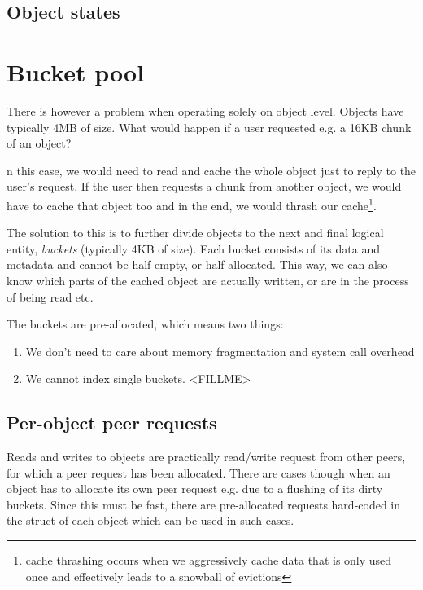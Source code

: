 
\subsection{Object states}


\section{Bucket pool}

There is however a problem when operating solely on object level. Objects have 
typically 4MB of size. What would happen if a user requested e.g. a 16KB chunk 
of an object?

n this case, we would need to read and cache the whole object just to reply to 
the user's request. If the user then requests a chunk from another object, we 
would have to cache that object too and in the end, we would thrash our 
cache\footnote{cache thrashing occurs when we aggressively cache data that is 
	only used once and effectively leads to a snowball of evictions}.

The solution to this is to further divide objects to the next and final logical 
entity, \emph{buckets} (typically 4KB of size). Each bucket consists of its data 
and metadata and cannot be half-empty, or half-allocated. This way, we can also 
know which parts of the cached object are actually written, or are in the 
process of being read etc.

The buckets are pre-allocated, which means two things:

\begin{enumerate}
	\item We don't need to care about memory fragmentation and system call 
		overhead
	\item We cannot index single buckets. <FILLME>
\end{enumerate}

\subsection{Per-object peer requests}

Reads and writes to objects are practically read/write request from other
peers, for which a peer request has been allocated. There are cases though
when an object has to allocate its own peer request e.g. due to a flushing of
its dirty buckets. Since this must be fast, there are pre-allocated requests
hard-coded in the struct of each object which can be used in such cases.

